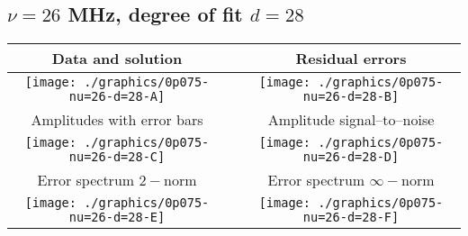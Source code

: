 

% 

\clearpage{}
\break{}

\subsection{$\nu = 26$ MHz, degree of fit $d = 28$}

\begin{table}[h]
    \begin{center}
        \begin{tabular}{ccc}
            Data and solution & \quad & Residual errors \\\hline
            \texttt{[image: ./graphics/0p075-nu=26-d=28-A]} &&
            \texttt{[image: ./graphics/0p075-nu=26-d=28-B]} \\[15pt]
            Amplitudes with error bars && Amplitude signal--to--noise \\\hline
            \texttt{[image: ./graphics/0p075-nu=26-d=28-C]} &&
            \texttt{[image: ./graphics/0p075-nu=26-d=28-D]} \\[15pt]
            Error spectrum $2-$norm && Error spectrum $\infty-$norm \\\hline
            \texttt{[image: ./graphics/0p075-nu=26-d=28-E]} &&
            \texttt{[image: ./graphics/0p075-nu=26-d=28-F]} \\[15pt]
        \end{tabular}
    \end{center}
\label{fig:elev=75, nu=26}
\end{table}



\endinput

